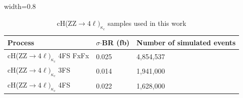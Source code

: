 \begin{table}[H]
    \centering
    \caption[]{cH(ZZ$\rightarrow4\ell)_{\kappa_c}$ samples used in this work}
    \begin{adjustbox}{width=0.8\textwidth}
    \label{table:SignalSamples}
        \begin{tabular}{l l l}
        \toprule 
        \textbf{Process} & \textbf{$\sigma$}$\cdot$BR (fb) & \textbf{Number of simulated events}\\
        \midrule 
        \midrule
        cH(ZZ$\rightarrow4\ell)_{\kappa_c}$ 4FS FxFx & 0.025 & 4,854,537 \\
        cH(ZZ$\rightarrow4\ell)_{\kappa_c}$ 3FS & 0.014 & 1,941,000 \\
        cH(ZZ$\rightarrow4\ell)_{\kappa_c}$ 4FS & 0.022 & 1,628,000 \\
        \bottomrule
        \end{tabular} 
    \end{adjustbox}
\end{table}
